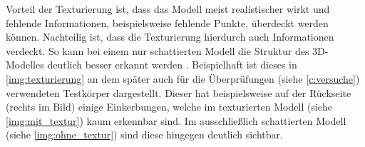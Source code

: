 \documentclass[./00PhotoBox.tex]{subfiles}
\begin{document}
Vorteil der Texturierung ist, dass das Modell meist realistischer wirkt und fehlende Informationen, beispielsweise fehlende Punkte, überdeckt werden können. Nachteilig ist, dass die Texturierung hierdurch auch Informationen verdeckt. So kann bei einem nur schattierten Modell die Struktur des 3D-Modelles deutlich besser erkannt werden \citep[vgl.][S. 702]{luhmann}. Beispielhaft ist dieses in \autoref{img:texturierung} an dem später auch für die Überprüfungen (siehe \autoref{c:versuche}) verwendeten Testkörper dargestellt. Dieser hat beispielsweise auf der Rückseite (rechts im Bild) einige Einkerbungen, welche im texturierten Modell (siehe \autoref{img:mit_textur}) kaum erkennbar sind. Im ausschließlich schattierten Modell (siehe \autoref{img:ohne_textur}) sind diese hingegen deutlich sichtbar.
\end{document}
